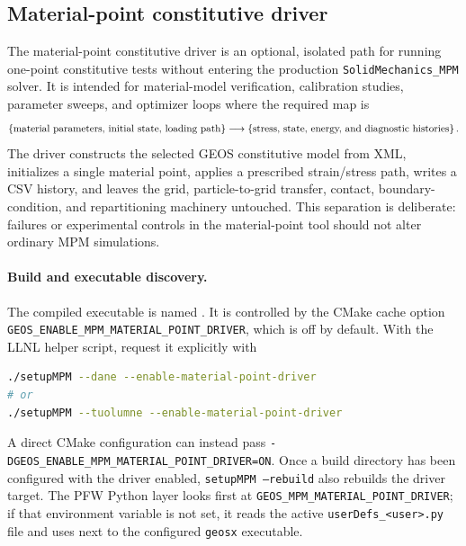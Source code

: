 \subsection{Material-point constitutive driver}
\label{subsec:material-point-driver}

The material-point constitutive driver is an optional, isolated path for running one-point constitutive tests without entering the production \texttt{SolidMechanics\_MPM} solver.  It is intended for material-model verification, calibration studies, parameter sweeps, and optimizer loops where the required map is
\begin{equation}
  \left\{\hbox{material parameters, initial state, loading path}\right\}
  \longrightarrow
  \left\{\hbox{stress, state, energy, and diagnostic histories}\right\}.
\end{equation}
The driver constructs the selected GEOS constitutive model from XML, initializes a single material point, applies a prescribed strain/stress path, writes a CSV history, and leaves the grid, particle-to-grid transfer, contact, boundary-condition, and repartitioning machinery untouched.  This separation is deliberate: failures or experimental controls in the material-point tool should not alter ordinary MPM simulations.

\paragraph{Build and executable discovery.}
The compiled executable is named .  It is controlled by the CMake cache option \texttt{GEOS\_ENABLE\_MPM\_MATERIAL\_POINT\_DRIVER}, which is off by default.  With the LLNL helper script, request it explicitly with
\begin{lstlisting}[language=bash,caption={Building the optional material-point executable.},label={lst:material-point-build},basicstyle=\ttfamily\small]
./setupMPM --dane --enable-material-point-driver
# or
./setupMPM --tuolumne --enable-material-point-driver
\end{lstlisting}
A direct CMake configuration can instead pass \texttt{-DGEOS\_ENABLE\_MPM\_MATERIAL\_POINT\_DRIVER=ON}.  Once a build directory has been configured with the driver enabled, \texttt{setupMPM --rebuild} also rebuilds the driver target.  The PFW Python layer looks first at \texttt{GEOS\_MPM\_MATERIAL\_POINT\_DRIVER}; if that environment variable is not set, it reads the active \texttt{userDefs\_<user>.py} file and uses  next to the configured \texttt{geosx} executable.

